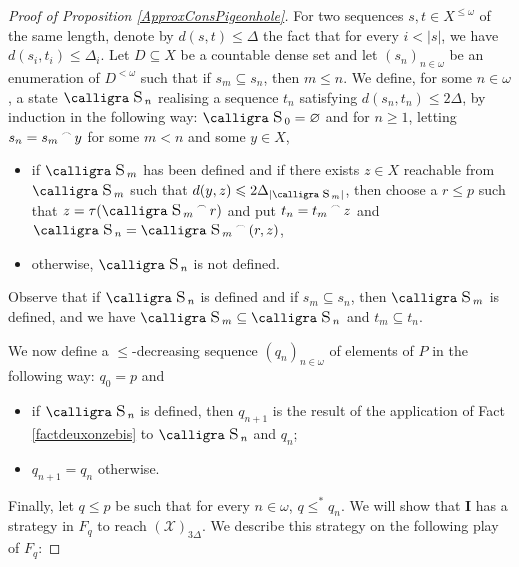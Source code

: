 \documentclass[a4paper,11pt]{article}
\theoremstyle{definition}
\numberwithin{equation}{section}
\newcommand{\X}{\mathcal{X}}
\newcommand{\I}{\textbf{I}}
\newcommand{\st}{\text{{\calligra \LARGE s}}\,}
\newcommand{\stp}{\text{{\calligra \large s}}\,}
\newcommand{\concat}{%
  \mathbin{\raisebox{1ex}{\scalebox{.7}{$\frown$}}}%
}
\begin{document}
\begin{proof}[Proof of Proposition \ref{ApproxConsPigeonhole}]
For two sequences $s, t \in X^{\leqslant \omega}$ of the same length, denote by $d(s, t) \leqslant \Delta$ the fact that for every $i < |s|$, we have $d(s_i, t_i) \leqslant \Delta_i$. Let $D \subseteq X$ be a countable dense set and let $(s_n)_{n \in \omega}$ be an enumeration of $D^{< \omega}$ such that if $s_m \subseteq s_n$, then $m \leqslant n$. We define, for some $n \in \omega$, a state $\st_n$ realising a sequence $t_n$ satisfying $d(s_n, t_n) \leqslant 2\Delta$, by induction in the following way: $\st_0 = \varnothing$ and for $n \geqslant 1$, letting $s_n = s_m \concat y$ for some $m < n$ and some $y \in X$,

\begin{samepage}
\begin{itemize}

\item if $\st_m$ has been defined and if there exists $z \in X$ reachable from $\st_m$ such that $d(y, z) \leqslant 2\Delta_{|\stp_m|}$, then choose a $r \leqslant p$ such that $z = \tau(\st_m \concat r)$ and put $t_n = t_m \concat z$ and $\st_n = \st_m \concat (r, z)$,

\item otherwise, $\st_n$ is not defined.

\end{itemize}
\end{samepage}

\noindent Observe that if $\st_n$ is defined and if $s_m \subseteq s_n$, then $\st_m$ is defined, and we have $\st_m \subseteq \st_n$ and $t_m \subseteq t_n$.

\smallskip

We now define a $\leqslant$-decreasing sequence $(q_n)_{n \in \omega}$ of elements of $P$ in the following way: $q_0 = p$ and

\begin{itemize}

\item if $\st_n$ is defined, then $q_{n + 1}$ is the result of the application of Fact \ref{factdeuxonzebis} to $\st_n$ and $q_n$;

\item $q_{n + 1} = q_n$ otherwise.

\end{itemize}

Finally, let $q \leqslant p$ be such that for every $n \in \omega$, $q \leqslant^* q_n$. We will show that \I{} has a strategy in $F_q$ to reach $(\X)_{3\Delta}$. We describe this strategy on the following play of $F_q$:


\end{proof}
\end{document}
